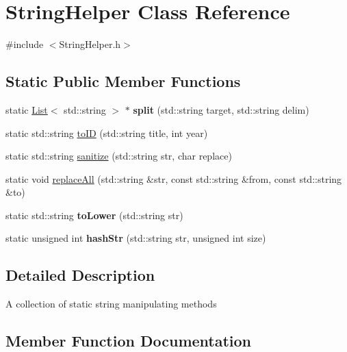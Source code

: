 \hypertarget{class_string_helper}{}\section{String\+Helper Class Reference}
\label{class_string_helper}


{\ttfamily \#include $<$String\+Helper.\+h$>$}

\subsection*{Static Public Member Functions}
\begin{DoxyCompactItemize}
\item 
\mbox{\label{class_string_helper_ac610979af20128f886c9f3f885ce5140}} 
static \hyperlink{class_list}{List}$<$ std\+::string $>$ $\ast$ {\bfseries split} (std\+::string target, std\+::string delim)
\item 
static std\+::string \hyperlink{class_string_helper_af1ebd6032d273477815fb71d50c47a82}{to\+ID} (std\+::string title, int year)
\item 
static std\+::string \hyperlink{class_string_helper_ae7ed857566d41bb983185121d9a85dd9}{sanitize} (std\+::string str, char replace)
\item 
static void \hyperlink{class_string_helper_a1e284887e820c917f1ad0e5358e8afda}{replace\+All} (std\+::string \&str, const std\+::string \&from, const std\+::string \&to)
\item 
\mbox{\label{class_string_helper_a731346b2d686aa86d3a97ae7a0ec01ac}} 
static std\+::string {\bfseries to\+Lower} (std\+::string str)
\item 
\mbox{\label{class_string_helper_a9623fcf0dcb856197bf535d6ecc61798}} 
static unsigned int {\bfseries hash\+Str} (std\+::string str, unsigned int size)
\end{DoxyCompactItemize}


\subsection{Detailed Description}
A collection of static string manipulating methods 

\subsection{Member Function Documentation}
\mbox{\label{class_string_helper_a1e284887e820c917f1ad0e5358e8afda}} 
